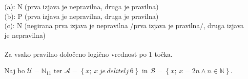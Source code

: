 \documentclass[addpoints,12pt]{exam}
\begin{document}
\begin{questions}
    \begin{solution}
        (a): N (prva izjava je nepravilna, druga je pravilna) \\
        (b): P (prva izjava je nepravilna, druga je pravilna) \\
        (c): N (negirana prva izjava je nepravilna /prva izjava je pravilna/, druga izjava je nepravilna) \\ \\
        Za vsako pravilno določeno logično vrednost po $1$ točka.
    \end{solution}



    \newpage

    \question
    Naj bo $\mathcal{U}=\mathbb{N}_{11}$ ter $\mathcal{A}=\left\{x;\ x~ je~ delitelj~ 6\right\}$ in $\mathcal{B}=\left\{x;\ x=2n\land n\in\mathbb{N}\right\}$.



\end{questions}
\end{document}
